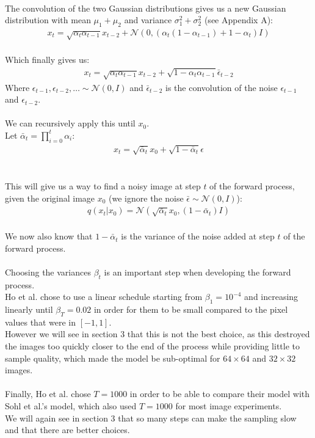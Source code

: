 \documentclass{article}
\begin{document}
\\
The convolution of the two Gaussian distributions gives us a new Gaussian distribution with mean $\mu_1 + \mu_2$ and variance $\sigma_1^2 + \sigma_2^2$ (see Appendix A):
\begin{align}
  x_t = \sqrt{\alpha_t \alpha_{t-1}} x_{t-2} + \mathcal{N}\left(0, \left(\alpha_t\left(1 - \alpha_{t-1}\right) + 1 - \alpha_t\right)I\right)
\end{align}
\\
Which finally gives us:
\begin{gather*}
  x_t = \sqrt{\alpha_t \alpha_{t-1}} x_{t-2} + \sqrt{1 - \alpha_t \alpha_{t-1}} \bar{\epsilon}_{t - 2}
\end{gather*}
Where $\epsilon_{t - 1}, \epsilon_{t - 2}, \ldots \sim \mathcal{N}\left(0, I\right)$ and $\bar{\epsilon}_{t - 2}$ is the convolution of the noise $\epsilon_{t - 1}$ and $\epsilon_{t - 2}$.
\\\\
We can recursively apply this until $x_0$. \\
Let $\bar{\alpha}_t = \prod_{i=0}^{t}{\alpha_i}$:
\begin{gather}
  x_t = \sqrt{\bar{\alpha}_t} x_0 + \sqrt{1 - \bar{\alpha}_t} \epsilon
\end{gather}
\\\\
This will give us a way to find a noisy image at step $t$ of the forward process, given the original image $x_0$ (we ignore the noise $\bar{\epsilon} \sim \mathcal{N}\left(0, I\right)$):
\begin{gather}
  q\left(x_t | x_0\right) = \mathcal{N}\left(\sqrt{\bar{\alpha}_t} x_0, \left(1 - \bar{\alpha}_t\right)I\right)
\end{gather}
\\
We now also know that $1 - \bar{\alpha}_t$ is the variance of the noise added at step $t$ of the forward process. \cite{nichol2021improved}
\\\\
Choosing the variances $\beta_t$ is an important step when developing the forward process. \\
Ho et al. \cite{ho2020denoising} chose to use a linear schedule starting from $\beta_1 = 10^{-4}$ and increasing linearly until $\beta_T = 0.02$ in order for them to be small compared to the pixel values that were in $\left[-1, 1\right]$. \cite{ho2020denoising} \\
However we will see in section 3 that this is not the best choice, as this destroyed the images too quickly closer to the end of the process while providing little to sample quality, which made the model be sub-optimal for $64 \times 64$ and $32 \times 32$ images. \cite{nichol2021improved}
\\\\
Finally, Ho et al. \cite{ho2020denoising} chose $T = 1000$ in order to be able to compare their model with Sohl et al.'s \cite{sohldickstein2015deep} model, which also used $T = 1000$ for most image experiments. \\
We will again see in section 3 that so many steps can make the sampling slow and that there are better choices. \cite{nichol2021improved}
\end{document}
